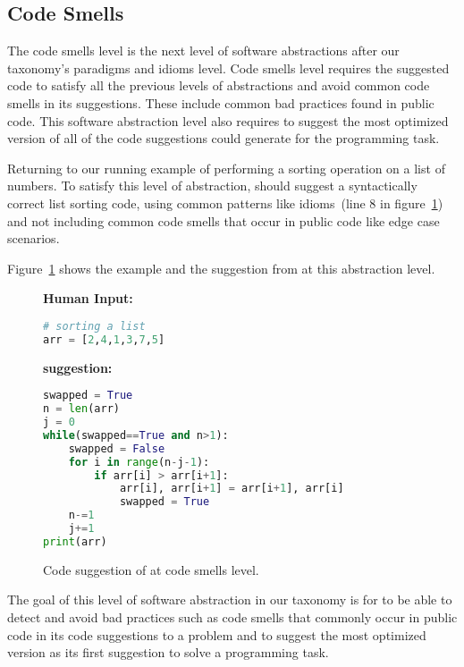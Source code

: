 \subsection{Code Smells}
The code smells level is the next level of software abstractions after our taxonomy's paradigms and idioms level. 
Code smells level requires the suggested code to satisfy all the previous levels of abstractions and avoid common code smells in its suggestions. These include common bad practices found in public code. 
This software abstraction level also requires \cct{} to suggest the most optimized version of all of the code suggestions \cct{} could generate for the programming task.

Returning to our running example of performing a sorting operation on a list of numbers. 
To satisfy this level of abstraction, \cct{} should suggest a syntactically correct list sorting code, using common patterns like idioms~(line 8 in figure~\ref{fig:smells}) and not including common code smells that occur in public code like edge case scenarios.

Figure~\ref{fig:smells} shows the example and the suggestion from \cct{} at this abstraction level.

\begin{figure}[hbt!]
    \centering
\begin{tcolorbox}[title=Code smells level suggestion for sort routine,boxsep=.15mm]
\textbf{Human Input:}
\begin{lstlisting}[language={Python}]
# sorting a list
arr = [2,4,1,3,7,5]
\end{lstlisting}
\tcbline
\textbf{\cct{} suggestion:}
\begin{lstlisting}[language={Python}, morekeywords={False, True}]
swapped = True
n = len(arr)
j = 0
while(swapped==True and n>1):
	swapped = False
	for i in range(n-j-1):
	    if arr[i] > arr[i+1]:
	        arr[i], arr[i+1] = arr[i+1], arr[i]
	        swapped = True
	n-=1
	j+=1
print(arr)
\end{lstlisting}
\end{tcolorbox}
    \caption{Code suggestion of \cct{} at code smells level.}
    \label{fig:smells}
\end{figure}

The goal of this level of software abstraction in our taxonomy is for \cct{} to be able to detect and avoid bad practices such as code smells that commonly occur in public code in its code suggestions to a problem and to suggest the most optimized version as its first suggestion to solve a programming task.

